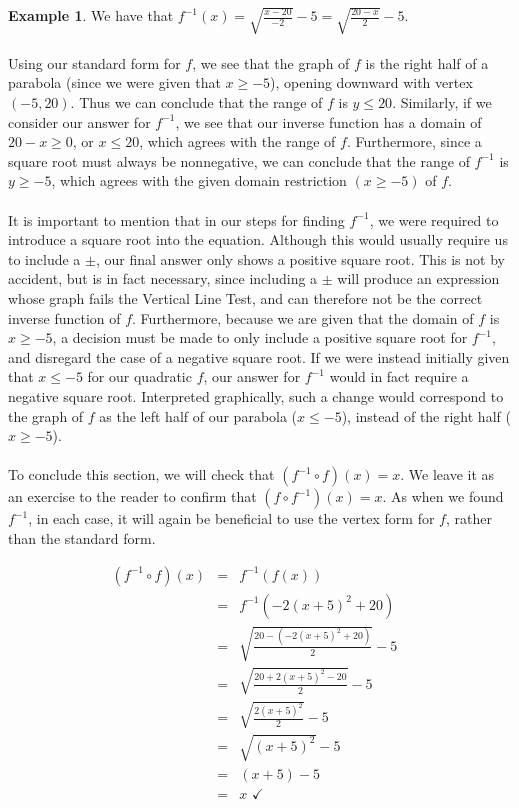 \documentclass[11pt]{book}
\theoremstyle{definition}  %
\newtheorem{example}{Example}[chapter]
\begin{document}
\begin{example}
We have that $f^{-1}(x)=\sqrt{\frac{x-20}{-2}}-5=\sqrt{\frac{20-x}{2}}-5$.\\
~\\
Using our standard form for $f$, we see that the graph of $f$ is the right half of a parabola (since we were given that $x\geq -5$), opening downward with vertex $(-5,20)$.  Thus we can conclude that the range of $f$ is $y\leq 20$.  Similarly, if we consider our answer for $f^{-1}$, we see that our inverse function has a domain of $20-x\geq 0$, or $x\leq 20$, which agrees with the range of $f$.  Furthermore, since a square root must always be nonnegative, we can conclude that the range of $f^{-1}$ is $y\geq -5$, which agrees with the given domain restriction $(x\geq -5)$ of $f$.\\
~\\
It is important to mention that in our steps for finding $f^{-1}$, we were required to introduce a square root into the equation.  Although this would usually require us to include a $\pm$, our final answer only shows a positive square root.  This is not by accident, but is in fact necessary, since including a $\pm$ will produce an expression whose graph fails the Vertical Line Test, and can therefore not be the correct inverse function of $f$.  Furthermore, because we are given that the domain of $f$ is $x\geq -5$, a decision must be made to only include a positive square root for $f^{-1}$, and disregard the case of a negative square root.  If we were instead initially given that $x\leq -5$ for our quadratic $f$, our answer for $f^{-1}$ would in fact require a negative square root.  Interpreted graphically, such a change would correspond to the graph of $f$ as the left half of our parabola ($x\leq -5$), instead of the right half ($x\geq -5$).\\
~\\
To conclude this section, we will check that $(f^{-1}\circ f)(x)=x$.  We leave it as an exercise to the reader to confirm that $(f\circ f^{-1})(x)=x$.  As when we found $f^{-1}$, in each case, it will again be beneficial to use the vertex form for $f$, rather than the standard form.

\[ \begin{array}{rclr}
\left(f^{-1}\circ f \right)(x) & = & f^{-1}\left(f(x)\right) & \\ [15pt]
 & = & f^{-1} \left(-2(x+5)^2+20\right) & \\ [15pt]
& = &  \sqrt{\frac{20-(-2(x+5)^2+20)}{2}}-5 \\ [30pt]
& = &  \sqrt{\frac{20+2(x+5)^2-20}{2}}-5  \\ [30pt]
& = &  \sqrt{\frac{2(x+5)^2}{2}}-5 & \\ [15pt]
& = &  \sqrt{(x+5)^2}-5 & \\ [15pt]
& = &  (x+5)-5 & \\ [15pt]
& = & x \, \, \checkmark \\
\end{array} \]
 
\end{example}
\end{document}
